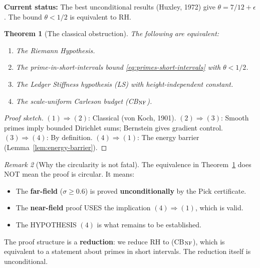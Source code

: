 \documentclass[11pt]{article}
\newtheorem{theorem}{Theorem}
\theoremstyle{definition}
\theoremstyle{remark}
\newtheorem{remark}[theorem]{Remark}
\theoremstyle{definition}
\begin{document}
\textbf{Current status:} The best unconditional results (Huxley, 1972) give $\theta = 7/12 + \epsilon$. The bound $\theta < 1/2$ is equivalent to RH.

\begin{theorem}[The classical obstruction]\label{thm:classical-obstruction}
The following are equivalent:
\begin{enumerate}
\item The Riemann Hypothesis.
\item The prime-in-short-intervals bound \eqref{eq:primes-short-intervals} with $\theta < 1/2$.
\item The Ledger Stiffness hypothesis \textup{(LS)} with height-independent constant.
\item The scale-uniform Carleson budget \textup{(CB$_{\rm NF}$)}.
\end{enumerate}
\end{theorem}
\begin{proof}[Proof sketch]
$(1) \Rightarrow (2)$: Classical (von Koch, 1901). 
$(2) \Rightarrow (3)$: Smooth primes imply bounded Dirichlet sums; Bernstein gives gradient control.
$(3) \Rightarrow (4)$: By definition.
$(4) \Rightarrow (1)$: The energy barrier (Lemma~\ref{lem:energy-barrier}).
\end{proof}

\begin{remark}[Why the circularity is not fatal]
The equivalence in Theorem~\ref{thm:classical-obstruction} does NOT mean the proof is circular. It means:
\begin{itemize}
\item The \textbf{far-field} ($\sigma \ge 0.6$) is proved \textbf{unconditionally} by the Pick certificate.
\item The \textbf{near-field} proof USES the implication $(4) \Rightarrow (1)$, which is valid.
\item The HYPOTHESIS $(4)$ is what remains to be established.
\end{itemize}

The proof structure is a \textbf{reduction}: we reduce RH to \textup{(CB$_{\rm NF}$)}, which is equivalent to a statement about primes in short intervals. The reduction itself is unconditional.
\end{remark}
\end{document}
